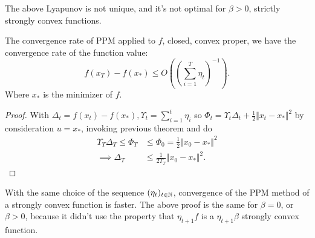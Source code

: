 \documentclass[12pt]{article}
\begin{document}
        \begin{remark}
            The above Lyapunov is not unique, and it's not optimal for $\beta > 0$, strictly strongly convex functions. 

        \end{remark}

        \begin{theorem}\label{thm:ppm_convergence_rate}
            The convergence rate of PPM applied to $f$, closed, convex proper, we have the convergence rate of the function value: 
            $$
            f(x_T) - f(x_*) \le O\left(\left(\sum_{i=1}^{T}\eta_t\right)^{-1}\right). 
            $$
            Where $x_*$ is the minimizer of $f$. 
        \end{theorem}
        \begin{proof}
            With $\Delta_t = f(x_t) - f(x_*), \Upsilon_t = \sum_{i = 1}^{t}\eta_i$ so $\Phi_t = \Upsilon_t\Delta_t + \frac{1}{2}\Vert x_t - x_*\Vert^2$ by consideration $u = x_*$, invoking previous theorem and do
            \begin{align*}
                \Upsilon_T\Delta_T \le \Phi_T 
                &\le 
                \Phi_0 = \frac{1}{2}\Vert x_0 - x_*\Vert^2 
                \\
                \implies \Delta_T 
                &\le 
                \frac{1}{2\Upsilon_T} \Vert x_0 - x_*\Vert^2. 
            \end{align*}
        \end{proof}
        \begin{remark}
            With the same choice of the sequence $(\eta_t)_{t \in \mathbb N}$, convergence of the PPM method of a strongly convex function is faster. 
            The above proof is the same for $\beta = 0$, or $\beta > 0$, because it didn't use the property that $\eta_{t + 1}f$ is a $\eta_{t + 1}\beta$ strongly convex function. 
        \end{remark}
\end{document}
